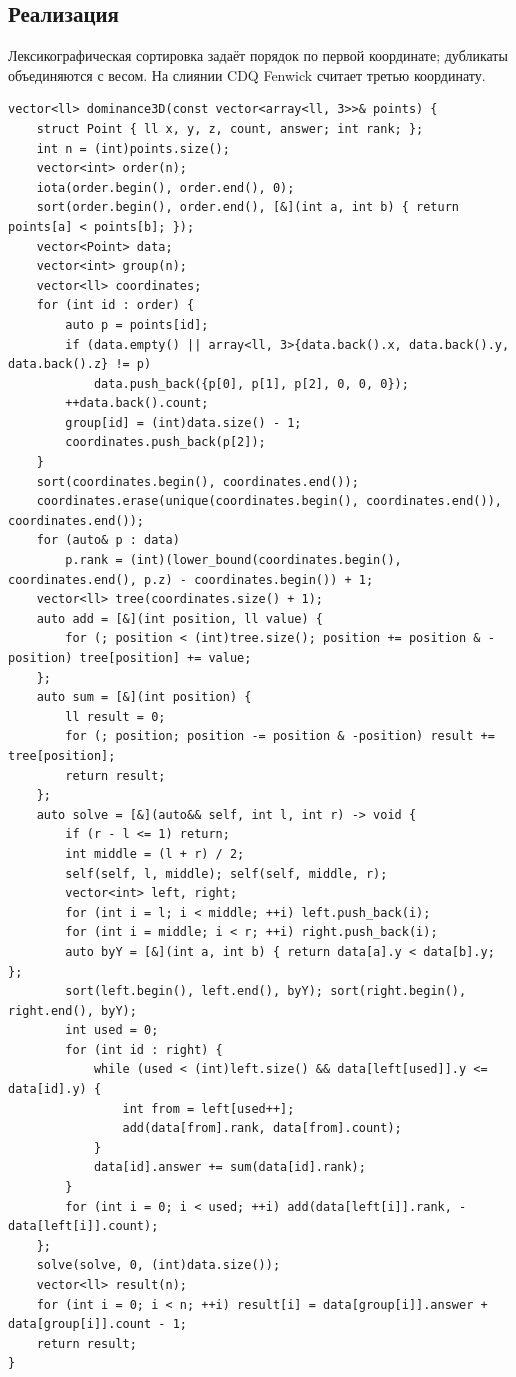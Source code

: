 \subsection*{Реализация}
Лексикографическая сортировка задаёт порядок по первой координате;
дубликаты объединяются с весом. На слиянии CDQ Fenwick считает третью координату.
\begin{lstlisting}[name=optimization_cdq]
vector<ll> dominance3D(const vector<array<ll, 3>>& points) {
    struct Point { ll x, y, z, count, answer; int rank; };
    int n = (int)points.size();
    vector<int> order(n);
    iota(order.begin(), order.end(), 0);
    sort(order.begin(), order.end(), [&](int a, int b) { return points[a] < points[b]; });
    vector<Point> data;
    vector<int> group(n);
    vector<ll> coordinates;
    for (int id : order) {
        auto p = points[id];
        if (data.empty() || array<ll, 3>{data.back().x, data.back().y, data.back().z} != p)
            data.push_back({p[0], p[1], p[2], 0, 0, 0});
        ++data.back().count;
        group[id] = (int)data.size() - 1;
        coordinates.push_back(p[2]);
    }
    sort(coordinates.begin(), coordinates.end());
    coordinates.erase(unique(coordinates.begin(), coordinates.end()), coordinates.end());
    for (auto& p : data)
        p.rank = (int)(lower_bound(coordinates.begin(), coordinates.end(), p.z) - coordinates.begin()) + 1;
    vector<ll> tree(coordinates.size() + 1);
    auto add = [&](int position, ll value) {
        for (; position < (int)tree.size(); position += position & -position) tree[position] += value;
    };
    auto sum = [&](int position) {
        ll result = 0;
        for (; position; position -= position & -position) result += tree[position];
        return result;
    };
    auto solve = [&](auto&& self, int l, int r) -> void {
        if (r - l <= 1) return;
        int middle = (l + r) / 2;
        self(self, l, middle); self(self, middle, r);
        vector<int> left, right;
        for (int i = l; i < middle; ++i) left.push_back(i);
        for (int i = middle; i < r; ++i) right.push_back(i);
        auto byY = [&](int a, int b) { return data[a].y < data[b].y; };
        sort(left.begin(), left.end(), byY); sort(right.begin(), right.end(), byY);
        int used = 0;
        for (int id : right) {
            while (used < (int)left.size() && data[left[used]].y <= data[id].y) {
                int from = left[used++];
                add(data[from].rank, data[from].count);
            }
            data[id].answer += sum(data[id].rank);
        }
        for (int i = 0; i < used; ++i) add(data[left[i]].rank, -data[left[i]].count);
    };
    solve(solve, 0, (int)data.size());
    vector<ll> result(n);
    for (int i = 0; i < n; ++i) result[i] = data[group[i]].answer + data[group[i]].count - 1;
    return result;
}
\end{lstlisting}
